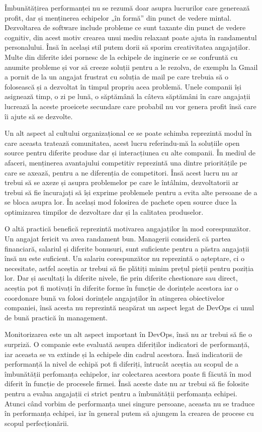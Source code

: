 Îmbunătățirea performanței nu se rezumă doar asupra lucrurilor care
generează profit, dar și menținerea echipelor „în formă” din punct de vedere
mintal. Dezvoltarea de software include probleme ce sunt taxante din punct de vedere
cognitiv, din acest motiv crearea unui mediu relaxant poate ajuta în randamentul personalului.
Însă în același stil putem dorii să sporim creativitatea angajaților. Multe
din diferite idei pornesc de la echipele de inginerie ce se confruntă cu anumite
probleme și vor să creeze soluții pentru a le rezolva, de exemplu la Gmail a pornit de la
un angajat frustrat cu soluția de mail pe care trebuia să o folosească și a dezvoltat
în timpul propriu acea problemă. Unele companii își asignează timp, o zi pe lună,
o săptămână la câteva săptămâni în care angajații lucrează la aceste proeicete
secundare care probabil nu vor genera profit însă care îi ajute să se dezvolte.

Un alt aspect al cultului organizațional ce se poate schimba reprezintă modul
în care aceasta tratează comunitatea, acest lucru referindu-mă la soluțiile open source
pentru diferite produse dar și interacțiunea cu alte companii.
În mediul de afaceri, menținerea avantajului competitiv reprezintă una dintre
prioritățile pe care se axează, pentru a ne diferenția de competitori. Însă
acest lucru nu ar trebui să se axeze și asupra problemelor pe care le întâlnim,
dezvoltatorii ar trebui să fie încurajați să își exprime problemele pentru a
evita alte persoane de a se bloca asupra lor. În același mod folosirea de
pachete open source duce la optimizarea timpilor de dezvoltare dar și la
calitatea produselor.

O altă practică benefică reprezintă motivarea angajaților în mod corespunzător.
Un angajat fericit va avea randament bun. Managerii consideră că partea financiară,
salariul și diferite bonusuri, sunt suficiente pentru a păstra angajații însă
nu este suficient. Un salariu corespunzător nu reprezintă o așteptare, ci o necesitate,
astfel aceștia ar trebui să fie plătiți minim prețul pieții pentru poziția lor.
Dar și ascultați la diferite nivele, fie prin diferite chestionare sau direct,
aceștia pot fi motivați în diferite forme în funcție de dorințele acestora
iar o coordonare bună va folosi dorințele angajaților în atingerea obiectivelor companiei,
însă acesta nu reprezintă neapărat un aspect legat de DevOps ci unul de bună practică în management.

Monitorizarea este un alt aspect important în DevOps, însă nu ar trebui să fie
o surpriză. O companie este evaluată asupra diferiților indicatori de performanță,
iar aceasta se va extinde și la echipele din cadrul acestora. Însă indicatorii
de performanță la nivel de echipă pot fi diferiți, întrucât aceștia au scopul
de a îmbunătății perfomanța echipelor, iar colectarea acestora poate fi făcută în mod diferit
în funcție de procesele firmei. Însă aceste date nu ar trebui să fie folosite
pentru a evalua angajații ci strict pentru a îmbunătății perfomanța echipei.
Atunci când vorbim de performanța unei singure persoane, aceasta nu se traduce
în performanța echipei, iar în general putem să ajungem la crearea de procese
cu scopul perfecționării.

